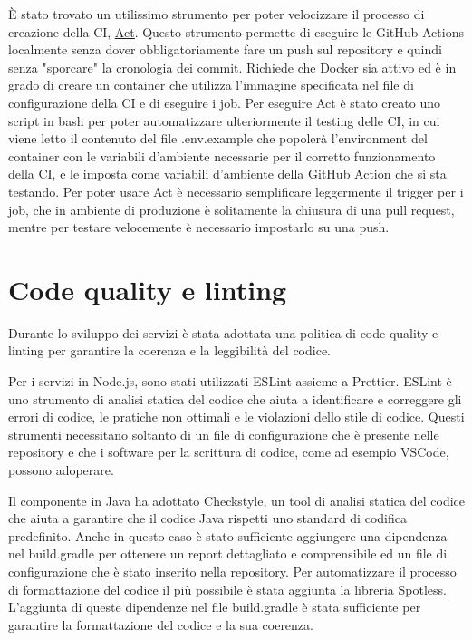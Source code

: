 È stato trovato un utilissimo strumento per poter velocizzare il processo di creazione della CI, \href{https://github.com/nektos/act}{\underline{Act}}. Questo strumento permette di eseguire le GitHub Actions localmente senza dover obbligatoriamente fare un push sul repository e quindi senza "sporcare" la cronologia dei commit. Richiede che Docker sia attivo ed è in grado di creare un container che utilizza l'immagine specificata nel file di configurazione della CI e di eseguire i job. Per eseguire Act è stato creato uno script in bash per poter automatizzare ulteriormente il testing delle CI, in cui viene letto il contenuto del file .env.example che popolerà l'environment del container con le variabili d'ambiente necessarie per il corretto funzionamento della CI, e le imposta come variabili d'ambiente della GitHub Action che si sta testando. Per poter usare Act è necessario semplificare leggermente il trigger per i job, che in ambiente di produzione è solitamente la chiusura di una pull request, mentre per testare velocemente è necessario impostarlo su una push.

\section{Code quality e linting} 
\label{code_quality}

Durante lo sviluppo dei servizi è stata adottata una politica di code quality e linting per garantire la coerenza e la leggibilità del codice.

\vspace{0.5cm}

Per i servizi in Node.js, sono stati utilizzati ESLint assieme a Prettier. ESLint è uno strumento di analisi statica del codice che aiuta a identificare e correggere gli errori di codice, le pratiche non ottimali e le violazioni dello stile di codice.
Questi strumenti necessitano soltanto di un file di configurazione che è presente nelle repository e che i software per la scrittura di codice, come ad esempio VSCode, possono adoperare.

\vspace{0.5cm}

Il componente in Java ha adottato Checkstyle, un tool di analisi statica del codice che aiuta a garantire che il codice Java rispetti uno standard di codifica predefinito. Anche in questo caso è stato sufficiente aggiungere una dipendenza nel build.gradle per ottenere un report dettagliato e comprensibile ed un file di configurazione che è stato inserito nella repository. Per automatizzare il processo di formattazione del codice il più possibile è stata aggiunta la libreria \href{https://github.com/diffplug/spotless}{\underline{Spotless}}. L'aggiunta di queste dipendenze nel file build.gradle è stata sufficiente per garantire la formattazione del codice e la sua coerenza.

